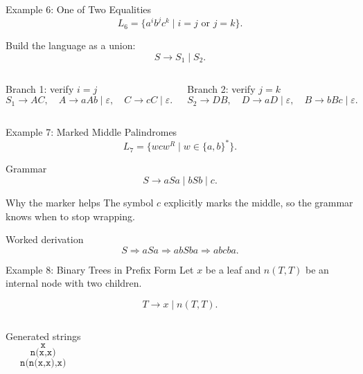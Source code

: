 \documentclass[aspectratio=169,10pt]{beamer}
\newcommand{\eps}{\varepsilon}
\newcommand{\der}{\Rightarrow}
\newcommand{\code}[1]{\texttt{#1}}
\begin{document}
\begin{frame}{Example 6: One of Two Equalities}
\small
\[
L_6=\{a^ib^jc^k\mid i=j\text{ or }j=k\}.
\]

Build the language as a union:
\[
S\to S_1\mid S_2.
\]

\begin{columns}[T,onlytextwidth]
\begin{block}{Branch 1: verify \(i=j\)}
\[
S_1\to A C,
\quad
A\to aAb\mid\eps,
\quad
C\to cC\mid\eps.
\]
\end{block}

\begin{exampleblock}{Branch 2: verify \(j=k\)}
\[
S_2\to D B,
\quad
D\to aD\mid\eps,
\quad
B\to bBc\mid\eps.
\]
\end{exampleblock}
\end{columns}
\end{frame}

\begin{frame}{Example 7: Marked Middle Palindromes}
\small
\[
L_7=\{wcw^R\mid w\in\{a,b\}^*\}.
\]

\begin{exampleblock}{Grammar}
\[
S\to aSa\mid bSb\mid c.
\]
\end{exampleblock}

\begin{block}{Why the marker helps}
The symbol \(c\) explicitly marks the middle, so the grammar knows when to stop wrapping.
\end{block}

\begin{exampleblock}{Worked derivation}
\[
S\der aSa\der abSba\der abcba.
\]
\end{exampleblock}
\end{frame}

\begin{frame}{Example 8: Binary Trees in Prefix Form}
\small
Let \(x\) be a leaf and \(n(T,T)\) be an internal node with two children.

\[
T\to x\mid n(T,T).
\]

\begin{columns}[T,onlytextwidth]
\begin{exampleblock}{Generated strings}
\[
\code{x}
\]
\[
\code{n(x,x)}
\]
\[
\code{n(n(x,x),x)}
\]
\end{exampleblock}

\centering
{}
\end{columns}
\end{frame}
\end{document}
